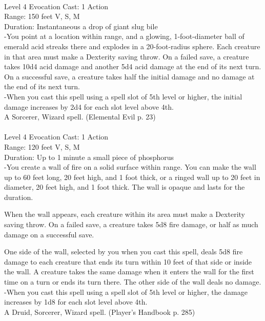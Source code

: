 \documentclass[10pt,twocolumn]{report}
\begin{document}
 \\
Level 4 \quad Evocation \quad Cast: 1 Action\\
Range: 150 feet \quad V, S, M\\
Duration: Instantaneous \quad a drop of giant slug bile\\
-You point at a location within range, and a glowing, 1-foot-diameter ball of emerald acid streaks there and explodes in a 20-foot-radius sphere. Each creature in that area must make a Dexterity saving throw. On a failed save, a creature takes 10d4 acid damage and another 5d4 acid damage at the end of its next turn. On a successful save, a creature takes half the initial damage and no damage at the end of its next turn.\\
-When you cast this spell using a spell slot of 5th level or higher, the initial damage increases by 2d4 for each slot level above 4th.\\
A Sorcerer, Wizard spell. (Elemental Evil p. 23) \\


 \\
Level 4 \quad Evocation \quad Cast: 1 Action\\
Range: 120 feet \quad V, S, M\\
Duration: Up to 1 minute \quad a small piece of phosphorus\\
-You create a wall of fire on a solid surface within range. You can make the wall up to 60 feet long, 20 feet high, and 1 foot thick, or a ringed wall up to 20 feet in diameter, 20 feet high, and 1 foot thick. The wall is opaque and lasts for the duration.

When the wall appears, each creature within its area must make a Dexterity saving throw. On a failed save, a creature takes 5d8 fire damage, or half as much damage on a successful save.

One side of the wall, selected by you when you cast this spell, deals 5d8 fire damage to each creature that ends its turn within 10 feet of that side or inside the wall. A creature takes the same damage when it enters the wall for the first time on a turn or ends its turn there. The other side of the wall deals no damage.\\
-When you cast this spell using a spell slot of 5th level or higher, the damage increases by 1d8 for each slot level above 4th.\\
A Druid, Sorcerer, Wizard spell. (Player's Handbook p. 285) \\
\end{document}
